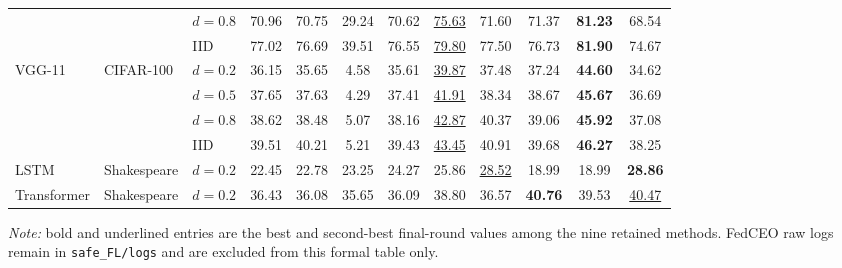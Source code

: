 \begin{table}[t]
{\begin{tabular}{lllccccccccc}
 &  & $d = 0.8$ & 70.96 & 70.75 & 29.24 & 70.62 & \underline{75.63} & 71.60 & 71.37 & \textbf{81.23} & 68.54 \\
 &  & IID & 77.02 & 76.69 & 39.51 & 76.55 & \underline{79.80} & 77.50 & 76.73 & \textbf{81.90} & 74.67 \\
\cline{2-12}
\multirow{4}{*}{VGG-11} & \multirow{4}{*}{CIFAR-100} & $d = 0.2$ & 36.15 & 35.65 & 4.58 & 35.61 & \underline{39.87} & 37.48 & 37.24 & \textbf{44.60} & 34.62 \\
 &  & $d = 0.5$ & 37.65 & 37.63 & 4.29 & 37.41 & \underline{41.91} & 38.34 & 38.67 & \textbf{45.67} & 36.69 \\
 &  & $d = 0.8$ & 38.62 & 38.48 & 5.07 & 38.16 & \underline{42.87} & 40.37 & 39.06 & \textbf{45.92} & 37.08 \\
 &  & IID & 39.51 & 40.21 & 5.21 & 39.43 & \underline{43.45} & 40.91 & 39.68 & \textbf{46.27} & 38.25 \\
\hline
\multirow{1}{*}{LSTM} & \multirow{1}{*}{Shakespeare} & $d = 0.2$ & 22.45 & 22.78 & 23.25 & 24.27 & 25.86 & \underline{28.52} & 18.99 & 18.99 & \textbf{28.86} \\
\multirow{1}{*}{Transformer} & \multirow{1}{*}{Shakespeare} & $d = 0.2$ & 36.43 & 36.08 & 35.65 & 36.09 & 38.80 & 36.57 & \textbf{40.76} & 39.53 & \underline{40.47} \\
\hline
\end{tabular}%
}
\vspace{1mm}
\parbox{\textwidth}{\scriptsize\emph{Note:} bold and underlined entries are the best and second-best final-round values among the nine retained methods. FedCEO raw logs remain in \texttt{safe\_FL/logs} and are excluded from this formal table only.}
\end{table}



